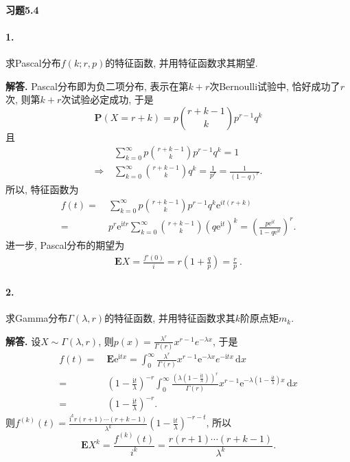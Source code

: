 \documentclass[12pt, a4paper, oneside]{ctexart}
\newenvironment{solution}{\par\noindent\textbf{解答. }}{\bigskip\par}
\def\d{\mathrm{d}}      %
\def\P{\textbf{P}}      %
\def\E{\textbf{E}}      %
\def\e{\mathrm{e}}      %
\def\i{\mathrm{i}}      %
\def\del{\vspace{-3.5ex}}  %
\begin{document}
\paragraph{习题5.4}
\paragraph{1.}求Pascal分布$f(k;r,p)$的特征函数, 并用特征函数求其期望.
\begin{solution}
    Pascal分布即为负二项分布, 表示在第$k+r$次Bernoulli试验中, 恰好成功了$r$次, 则第$k+r$次试验必定成功, 于是
    \begin{equation*}
        \P(X = r+k) = p\binom{r+k-1}{k}p^{r-1}q^k
    \end{equation*}
    且
    \begin{align*}
        &\ \sum_{k=0}^\infty p\binom{r+k-1}{k}p^{r-1}q^k = 1\\
        \Rightarrow&\ \sum_{k=0}^\infty \binom{r+k-1}{k}q^k = \frac{1}{p^r} = \frac{1}{(1-q)^r}.
    \end{align*}
    所以, 特征函数为
    \begin{align*}
        f(t) =&\ \sum_{k=0}^\infty p\binom{r+k-1}{k}p^{r-1}q^k\e^{it(r+k)}\\
        =&\ p^r\e^{\i tr}\sum_{k=0}^\infty\binom{r+k-1}{k}\left(q\e^{\i t}\right)^k = \left(\frac{p\e^{\i t}}{1-q\e^{\i t}}\right)^r.
    \end{align*}
    进一步, Pascal分布的期望为
    \begin{align*}
        \E X = \frac{f'(0)}{i} = r\left(1+\frac{q}{p}\right) = \frac{r}{p}\ .
    \end{align*}
\end{solution}\del\del
\paragraph{2.}求Gamma分布$\Gamma(\lambda, r)$的特征函数, 并用特征函数求其$k$阶原点矩$m_k$.
\begin{solution}
    设$X\sim \Gamma(\lambda, r)$, 则$p(x) = \frac{\lambda^r}{\Gamma(r)}x^{r-1}e^{-\lambda x}$, 于是
    \begin{align*}
        f(t)=&\ \E\e^{\i tx} = \int_0^\infty \frac{\lambda^r}{\Gamma(r)}x^{r-1}\e^{-\lambda x}e^{-\i tx}\,\d x\\
        =&\ \left(1-\frac{\i t}{\lambda}\right)^{-r}\int_0^\infty \frac{\left(\lambda\left(1-\frac{\i t}{\lambda}\right)\right)^r}{\Gamma(r)}x^{r-1}\e^{-\lambda\left(1-\frac{\i t}{\lambda}\right)x}\,\d x\\
        =&\ \left(1-\frac{\i t}{\lambda}\right)^{-r}.
    \end{align*}
    则$f^{(k)}(t) = \frac{\i^kr(r+1)\cdots(r+k-1)}{\lambda^k}\left(1-\frac{\i t}{\lambda}\right)^{-r-t}$, 所以
    \begin{equation*}
        \E X^k = \frac{f^{(k)}(t)}{i^k} = \frac{r(r+1)\cdots(r+k-1)}{\lambda^k}.
    \end{equation*}
\end{solution}\del\del
\end{document}
